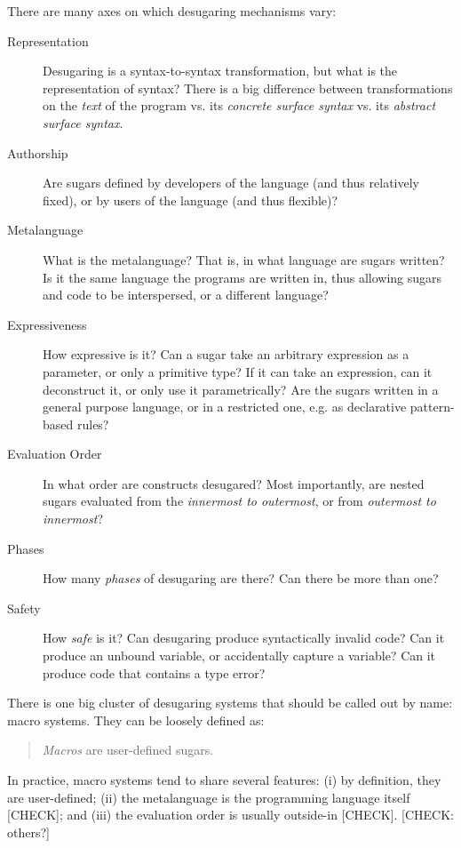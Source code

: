There are many axes on which desugaring mechanisms vary:
\begin{description}
  \item[Representation] Desugaring is a syntax-to-syntax transformation, but what is
    the representation of syntax? There is a big difference between
    transformations on the \emph{text} of the program vs. its
    \emph{concrete surface syntax} vs. its \emph{abstract surface
      syntax}.
  \item[Authorship] Are sugars defined by developers of the language (and thus
    relatively fixed), or by users of the language (and thus flexible)? %
  \item[Metalanguage] What is the metalanguage? That is, in what language are sugars
    written? Is it the same language the programs are written in, thus
    allowing sugars and code to be interspersed, or a different
    language?
  \item[Expressiveness] How expressive is it? Can a sugar take an arbitrary expression
    as a parameter, or only a primitive type? If it can take an
    expression, can it deconstruct it, or only use it parametrically?
    Are the sugars written in a general purpose language, or in a
    restricted one, e.g. as declarative pattern-based rules?
  \item[Evaluation Order] In what order are constructs desugared? Most importantly, are
    nested sugars evaluated from the \emph{innermost to outermost}, or
    from \emph{outermost to innermost}?
  \item[Phases] How many \emph{phases} of desugaring are there? Can there be
    more than one?
  \item[Safety] How \emph{safe} is it? Can desugaring produce syntactically
    invalid code? Can it produce an unbound variable, or accidentally
    capture a variable? Can it produce code that contains a type error?
\end{description}

There is one big cluster of desugaring systems that should be called
out by name: macro systems. They can be loosely defined as:
\begin{quote}
  \emph{Macros} are user-defined sugars.
\end{quote}
In practice, macro systems tend to share several features: (i) by
definition, they are user-defined; (ii) the metalanguage is the
programming language itself [CHECK]; and (iii) the evaluation order is
usually outside-in [CHECK]. [CHECK: others?]


